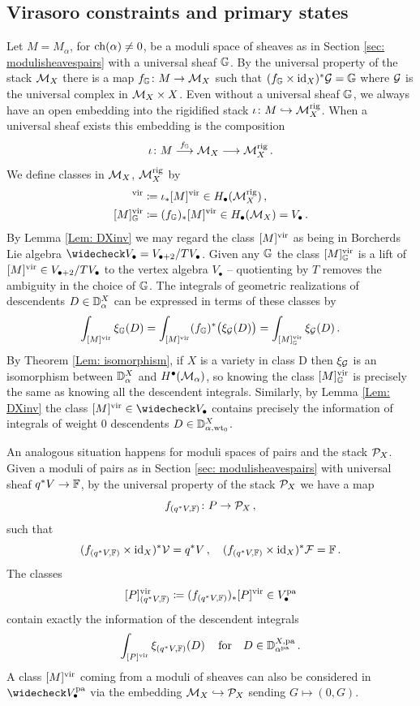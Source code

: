 \documentclass[a4paper, 12pt]{amsart}
\begin{document}
\subsection{Virasoro constraints and primary states}
\label{subsec: virasoroprimary}

Let $M=M_\alpha$, for $\mathrm{ch}(\alpha)\neq 0$, be a moduli space of sheaves as in Section \ref{sec: modulisheavespairs} with a universal sheaf ${\mathbb{G}}$. By the universal property of the stack ${\mathcal M}_X$ there is a map $f_{\mathbb{G}}\colon M\to {\mathcal M}_X$ such that
$(f_{\mathbb{G}}\times \operatorname{id}_X)^\ast {\mathcal G}={\mathbb{G}}$
where ${\mathcal G}$ is the universal complex in ${\mathcal M}_X\times X$. Even without a universal sheaf ${\mathbb{G}}$, we always have an open embedding into the rigidified stack $\iota\colon M \hookrightarrow {\mathcal M}_X^{\mathrm{rig}}$. When a universal sheaf exists this embedding is the composition
\[\iota\colon M\overset{f_{\mathbb{G}}}{\longrightarrow} {\mathcal M}_X\longrightarrow {\mathcal M}_X^{\mathrm{rig}}\,.\]
We define classes in ${\mathcal M}_X$, ${\mathcal M}_X^{\mathrm{rig}}$ by
\begin{align*}
[M]^\vir&\coloneqq \iota_\ast [M]^\vir \in H_\bullet(\CM_X^\rig)\,,\\
[M]^\vir_\BG&\coloneqq (f_\BG)_\ast [M]^\vir \in H_\bullet(\CM_X)=V_\bullet\,.
\end{align*}
By Lemma \ref{Lem: DXinv} we may regard the class $[M]^{\mathrm{vir}}$ as being in Borcherds Lie algebra $\widecheck V_\bullet=V_{\bullet+2}/TV_\bullet$. Given any ${\mathbb{G}}$ the class $[M]^{\mathrm{vir}}_{\mathbb{G}}$ is a lift of $[M]^{\mathrm{vir}}\in  V_{\bullet+2}/TV_\bullet$ to the vertex algebra $V_\bullet$ -- quotienting by $T$ removes the ambiguity in the choice of ${\mathbb{G}}$. The integrals of geometric realizations of descendents $D\in {\mathbb{D}}^X_\alpha$ can be expressed in terms of these classes by
\[\int_{[M]^{\mathrm{vir}}}\xi_{\mathbb{G}}(D)=\int_{[M]^{\mathrm{vir}}}(f_{\mathbb{G}})^\ast \big(\xi_{\mathcal G}(D)\big)=\int_{[M]^{\mathrm{vir}}_{\mathbb{G}}}\xi_{\mathcal G}(D)\,.\]
By Theorem \ref{Lem: isomorphism}, if $X$ is a variety in class D then $\xi_{\mathcal G}$ is an isomorphism between ${\mathbb{D}}^X_\alpha$ and $H^\bullet({\mathcal M}_\alpha)$, so knowing the class $[M]^{\mathrm{vir}}_{\mathbb{G}}$ is precisely the same as knowing all the descendent integrals. Similarly, by Lemma \ref{Lem: DXinv} the class $[M]^\vir \in \widecheck V_\bullet$ contains precisely the information of integrals of weight 0 descendents $D\in {\mathbb{D}}^X_{\alpha, {\mathrm{wt}_0}}$.

An analogous situation happens for moduli spaces of pairs and the stack ${\mathcal P}_X$. Given a moduli of pairs as in Section \ref{sec: modulisheavespairs} with universal sheaf $q^\ast V\to {\mathbb{F}}$, by the universal property of the stack ${\mathcal P}_X$ we have a map
\[f_{(q^\ast V, {\mathbb{F}})}\colon P\to {\mathcal P}_X\,,\]
such that 
\[(f_{(q^\ast V, {\mathbb{F}})}\times \operatorname{id}_X)^\ast {\mathcal V}=q^\ast V\,,\quad (f_{(q^\ast V, {\mathbb{F}})}\times \operatorname{id}_X)^\ast {\mathcal F}={\mathbb{F}}\,.\]
The classes 
\[[P]^{\mathrm{vir}}_{(q^\ast V, {\mathbb{F}})}\coloneqq (f_{(q^\ast V, {\mathbb{F}})})_\ast [P]^{\mathrm{vir}}\in V_\bullet^{\mathop{\rm pa}\nolimits}\] 
contain exactly the information of the descendent integrals
\[\int_{[P]^{\mathrm{vir}}}\xi_{(q^\ast V, {\mathbb{F}})}(D)\,\quad\textup{for}\quad D\in {\mathbb{D}}^{X, {\mathop{\rm pa}\nolimits}}_{\alpha^{\mathop{\rm pa}\nolimits}}\,.\]
A class $[M]^{\mathrm{vir}}$ coming from a moduli of sheaves can also be considered in $\widecheck V_\bullet^{\pa}$ via the embedding ${\mathcal M}_X\hookrightarrow {\mathcal P}_X$ sending $G\mapsto (0,G)$.
\end{document}

